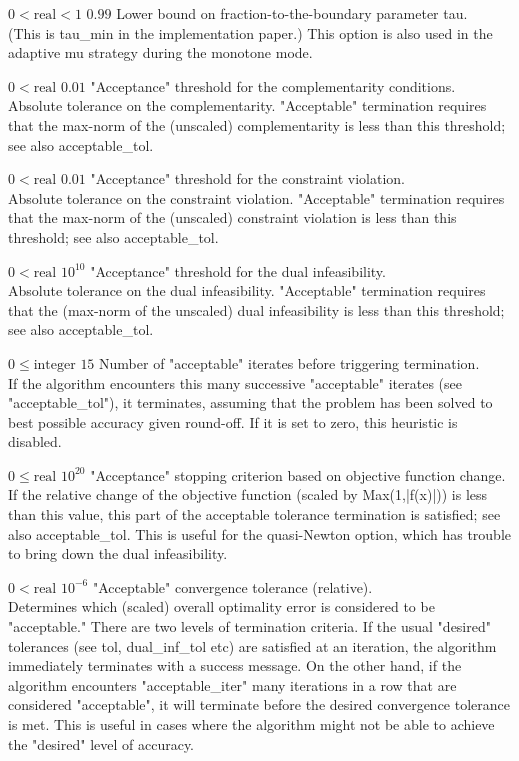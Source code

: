 %
{$0<\textrm{real}<1$}%
{$0.99$}%
{Lower bound on fraction-to-the-boundary parameter tau.\\
(This is tau\_min in the implementation paper.)  This option is also used in the adaptive mu strategy during the monotone mode.}%
{}

%
{$0<\textrm{real}$}%
{$0.01$}%
{"Acceptance" threshold for the complementarity conditions.\\
Absolute tolerance on the complementarity. "Acceptable" termination requires that the max-norm of the (unscaled) complementarity is less than this threshold; see also acceptable\_tol.}%
{}

%
{$0<\textrm{real}$}%
{$0.01$}%
{"Acceptance" threshold for the constraint violation.\\
Absolute tolerance on the constraint violation. "Acceptable" termination requires that the max-norm of the (unscaled) constraint violation is less than this threshold; see also acceptable\_tol.}%
{}

%
{$0<\textrm{real}$}%
{$10^{ 10}$}%
{"Acceptance" threshold for the dual infeasibility.\\
Absolute tolerance on the dual infeasibility. "Acceptable" termination requires that the (max-norm of the unscaled) dual infeasibility is less than this threshold; see also acceptable\_tol.}%
{}

%
{$0\leq\textrm{integer}$}%
{$15$}%
{Number of "acceptable" iterates before triggering termination.\\
If the algorithm encounters this many successive "acceptable" iterates (see "acceptable\_tol"), it terminates, assuming that the problem has been solved to best possible accuracy given round-off.  If it is set to zero, this heuristic is disabled.}%
{}

%
{$0\leq\textrm{real}$}%
{$10^{ 20}$}%
{"Acceptance" stopping criterion based on objective function change.\\
If the relative change of the objective function (scaled by Max(1,|f(x)|)) is less than this value, this part of the acceptable tolerance termination is satisfied; see also acceptable\_tol.  This is useful for the quasi-Newton option, which has trouble to bring down the dual infeasibility.}%
{}

%
{$0<\textrm{real}$}%
{$10^{- 6}$}%
{"Acceptable" convergence tolerance (relative).\\
Determines which (scaled) overall optimality error is considered to be "acceptable." There are two levels of termination criteria.  If the usual "desired" tolerances (see tol, dual\_inf\_tol etc) are satisfied at an iteration, the algorithm immediately terminates with a success message.  On the other hand, if the algorithm encounters "acceptable\_iter" many iterations in a row that are considered "acceptable", it will terminate before the desired convergence tolerance is met. This is useful in cases where the algorithm might not be able to achieve the "desired" level of accuracy.}%
{}

